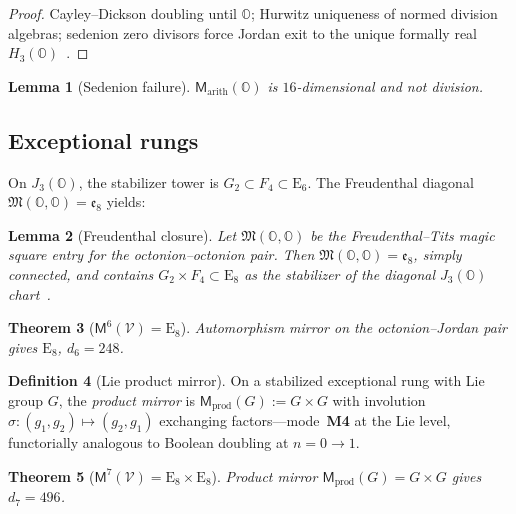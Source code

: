 \documentclass[11pt]{article}
\theoremstyle{plain}
\newtheorem{theorem}{Theorem}[section]
\newtheorem{lemma}[theorem]{Lemma}
\theoremstyle{definition}
\newtheorem{definition}[theorem]{Definition}
\theoremstyle{remark}
\numberwithin{equation}{section}
\newcommand{\Oct}{\mathbb{O}}
\newcommand{\jalg}{J_3(\mathbb{O})}
\newcommand{\E}[1]{\mathrm{E}_{#1}}
\newcommand{\Void}{\mathcal{V}}
\newcommand{\Mirror}{\mathsf{M}}
\begin{document}
\begin{proof}
Cayley--Dickson doubling until $\Oct$; Hurwitz uniqueness of normed division
algebras; sedenion zero divisors force Jordan exit to the unique formally real
$H_3(\Oct)$~\cite{Hurwitz1898,SpringerVeldkamp2000}.
\end{proof}

\begin{lemma}[Sedenion failure]\label{lem:sedenion}
$\Mirror_{\mathrm{arith}}(\Oct)$ is $16$-dimensional and not division.
\end{lemma}

\subsection{Exceptional rungs}
\label{sec:climb:exceptional}

On $\jalg$, the stabilizer tower is $G_2\subset F_4\subset\E{6}$. The
Freudenthal diagonal $\mathfrak{M}(\Oct,\Oct)=\mathfrak{e}_8$ yields:

\begin{lemma}[Freudenthal closure]\label{lem:freudenthal}
Let $\mathfrak{M}(\Oct,\Oct)$ be the Freudenthal--Tits magic square entry for
the octonion--octonion pair. Then $\mathfrak{M}(\Oct,\Oct)=\mathfrak{e}_8$,
simply connected, and contains $G_2\times F_4\subset\E{8}$ as the stabilizer of
the diagonal $\jalg$ chart~\cite{Freudenthal1954,Tits1966}.
\end{lemma}

\begin{theorem}[$\Mirror^6(\Void)=\E{8}$]\label{thm:e8}
Automorphism mirror on the octonion--Jordan pair gives $\E{8}$, $d_6=248$.
\end{theorem}

\begin{definition}[Lie product mirror]\label{def:prod-mirror}
On a stabilized exceptional rung with Lie group $G$, the \emph{product mirror}
is $\Mirror_{\mathrm{prod}}(G):=G\times G$ with involution
$\sigma:(g_1,g_2)\mapsto(g_2,g_1)$ exchanging factors---mode~\textbf{M4} at the
Lie level, functorially analogous to Boolean doubling at $n=0\to1$.
\end{definition}

\begin{theorem}[$\Mirror^7(\Void)=\E{8}\times\E{8}$]\label{thm:e8e8}
Product mirror $\Mirror_{\mathrm{prod}}(G)=G\times G$ gives $d_7=496$.
\end{theorem}
\end{document}
